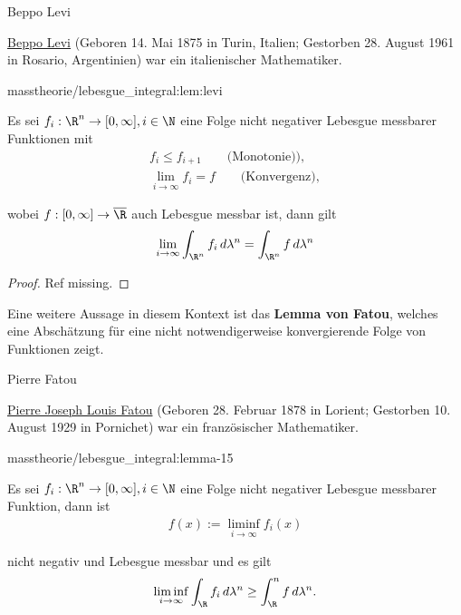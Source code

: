 \documentclass[letterpaper,10pt,german]{jupyterBook}
\begin{document}
\begin{emphBox}{Beppo Levi}{}

\par
\href{https://de.wikipedia.org/wiki/Beppo\_Levi}{Beppo Levi} (Geboren 14. Mai 1875 in Turin, Italien; Gestorben 28. August 1961 in Rosario, Argentinien) war ein italienischer Mathematiker.
\end{emphBox}
\begin{lemma}{}{masstheorie/lebesgue_integral:lem:levi}



\par
Es sei \(f_i:\R^n\to[0,\infty],i\in\N\) eine Folge nicht negativer Lebesgue messbarer Funktionen mit
\begin{align*}
f_i\leq f_{i+1}\qquad\text{(Monotonie))},\\
\lim_{i\to\infty} f_i = f\qquad\text{(Konvergenz)},
\end{align*}
\par
wobei \(f:[0,\infty]\to\overline{\R}\) auch Lebesgue messbar ist, dann gilt
\begin{align*}
\lim_{i\to\infty} \int_{\R^n} f_i \,d\lambda^n = \int_{\R^n} f \,d\lambda^n
\end{align*}\end{lemma}

\begin{proof}
 Ref missing.
\end{proof}

\par
Eine weitere Aussage in diesem Kontext ist das \textbf{Lemma von Fatou}, welches eine Abschätzung für eine nicht notwendigerweise konvergierende Folge von Funktionen zeigt.

\begin{emphBox}{Pierre Fatou}{}

\par
\href{https://de.wikipedia.org/wiki/Pierre\_Fatou}{Pierre Joseph Louis Fatou} (Geboren 28. Februar 1878 in Lorient; Gestorben 10. August 1929 in Pornichet) war ein französischer Mathematiker.
\end{emphBox}
\begin{lemma}{}{masstheorie/lebesgue_integral:lemma-15}



\par
Es sei \(f_i:\R^n\to[0,\infty],i\in\N\) eine Folge nicht negativer Lebesgue messbarer Funktion, dann ist
\begin{align*}
f(x) := \liminf_{i\to\infty} f_i(x)
\end{align*}
\par
nicht negativ und Lebesgue messbar und es gilt
\begin{align*}
\liminf_{i\to\infty} \int_{\R} f_i\, d\lambda^n \geq \int_\R^n f\, d\lambda^n.
\end{align*}\end{lemma}
\end{document}
